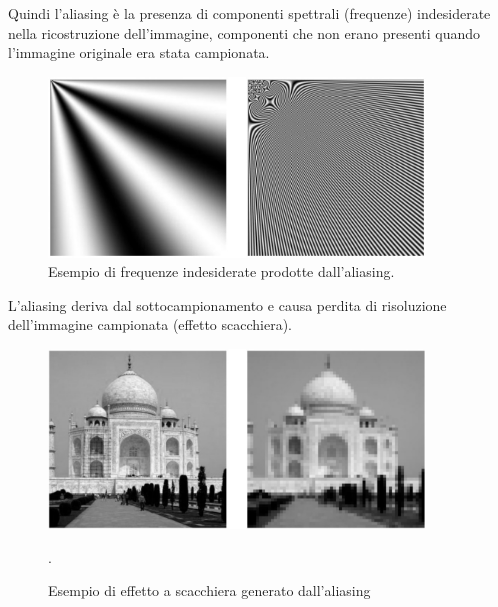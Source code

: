 Quindi l'aliasing è la presenza di componenti spettrali (frequenze) indesiderate
nella ricostruzione dell'immagine, componenti che non erano presenti quando
l'immagine originale era stata campionata.

\begin{figure}[H]
    \centering
    \includegraphics[width=10cm, keepaspectratio]{capitoli/immagini/imgs/aliasing_componenti_spettrali.jpg}
    \caption{Esempio di frequenze indesiderate prodotte dall'aliasing.}
\end{figure}

L'aliasing deriva dal sottocampionamento e causa perdita di risoluzione
dell'immagine campionata (effetto scacchiera).

\begin{figure}[H]
    \centering
    \includegraphics[width=10cm, keepaspectratio]{capitoli/immagini/imgs/aliasing_tajmahal.jpg}
    \caption{Esempio di effetto a scacchiera generato dall'aliasing}.
\end{figure}

